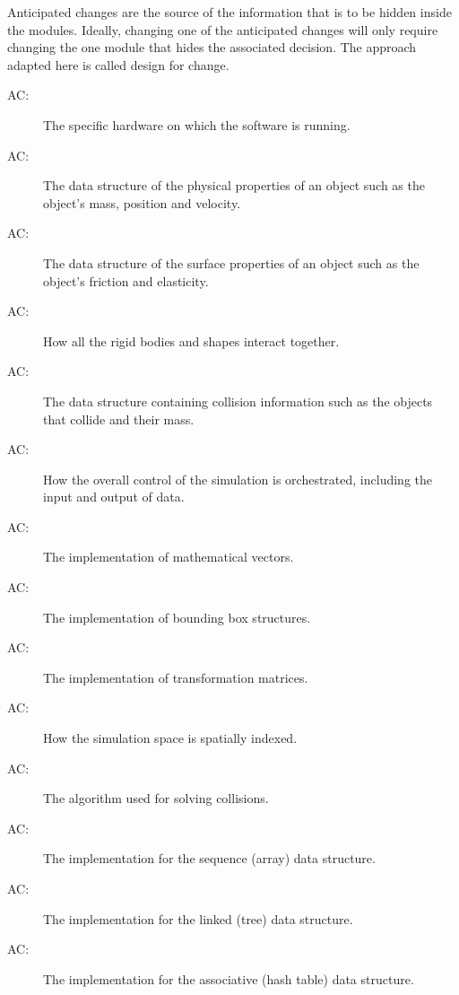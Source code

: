 \documentclass[12pt]{article}
\newcounter{acnum}
\newcommand{\actheacnum}{AC\theacnum}
\begin{document}
Anticipated changes are the source of the information that is to be hidden
inside the modules. Ideally, changing one of the anticipated changes will only
require changing the one module that hides the associated decision. The approach
adapted here is called design for
change. %

\begin{description}
\item[ \actheacnum \label{acHardware}:] The specific
  hardware on which the software is running.
\item[ \actheacnum \label{acBody}:] The data structure of the
physical properties of an object such as the object's mass, position and velocity.
\item[ \actheacnum \label{acShape}:] The data structure of the
surface properties of an object such as the object's friction and elasticity.
\item[ \actheacnum \label{acSpace}:] How all the rigid
bodies and shapes interact together.
\item[ \actheacnum \label{acCollision}:] The data structure containing collision information such as the objects that collide and their mass. 
\item[ \actheacnum \label{acControl}:] How the overall
  control of the simulation is orchestrated, including the input and output of data.
\item[ \actheacnum \label{acVector}:] The implementation of mathematical vectors.
\item[ \actheacnum \label{acBBox}:] The implementation of bounding box structures.
\item[ \actheacnum \label{acTrans}:] The implementation of transformation matrices.
\item[ \actheacnum \label{acSpatialIndex}:] How the simulation space is spatially indexed.
\item[ \actheacnum \label{acSolver}:] The algorithm used for solving collisions.
\item[ \actheacnum \label{acSeqDS}:] The implementation
  for the sequence (array) data structure.
\item[ \actheacnum \label{acLinkDS}:] The implementation for the linked (tree) data structure.
\item[ \actheacnum \label{acAssocDS}:] The implementation
  for the associative (hash table) data structure.
\end{description}
\end{document}
